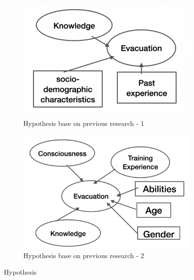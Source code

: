 \begin{figure}[h]
  \begin{subfigure}{0.48\textwidth}
\centering
  \includegraphics[width=\linewidth]{Figure/Figure7.png}
  \caption{Hypothesis base on previous research - 1 }
  \label{fig7}
  \end{subfigure}
  \begin{subfigure}{0.48\textwidth}
\centering
  \includegraphics[width=\linewidth]{Figure/Figure8.png}
  \caption{Hypothesis base on previous research - 2 }
  \label{fig8}
  \end{subfigure}\hfill
  \caption{Hypothesis}
\end{figure}

